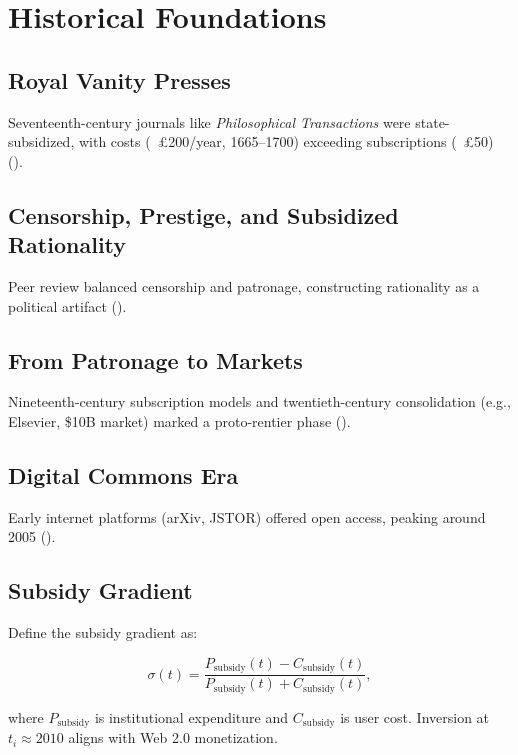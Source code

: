 \documentclass[12pt]{article}
\begin{document}
\section{Historical Foundations}

\subsection{Royal Vanity Presses}

Seventeenth-century journals like \textit{Philosophical Transactions} were state-subsidized, with costs (~£200/year, 1665–1700) exceeding subscriptions (~£50) (\citealp{Johns1998,Biagioli2002}).

\subsection{Censorship, Prestige, and Subsidized Rationality}

Peer review balanced censorship and patronage, constructing rationality as a political artifact (\citealp{Biagioli2002}).

\subsection{From Patronage to Markets}

Nineteenth-century subscription models and twentieth-century consolidation (e.g., Elsevier, \$10B market) marked a proto-rentier phase (\citealp{Fyfe2016,Csiszar2018}).

\subsection{Digital Commons Era}

Early internet platforms (arXiv, JSTOR) offered open access, peaking around 2005 (\citealp{Csiszar2018}).

\subsection{Subsidy Gradient}

Define the subsidy gradient as:

\[
\sigma(t) = \frac{P_{\text{subsidy}}(t) - C_{\text{subsidy}}(t)}{P_{\text{subsidy}}(t) + C_{\text{subsidy}}(t)},
\]

where \(P_{\text{subsidy}}\) is institutional expenditure and \(C_{\text{subsidy}}\) is user cost. Inversion at \(t_i \approx 2010\) aligns with Web 2.0 monetization.
\end{document}
